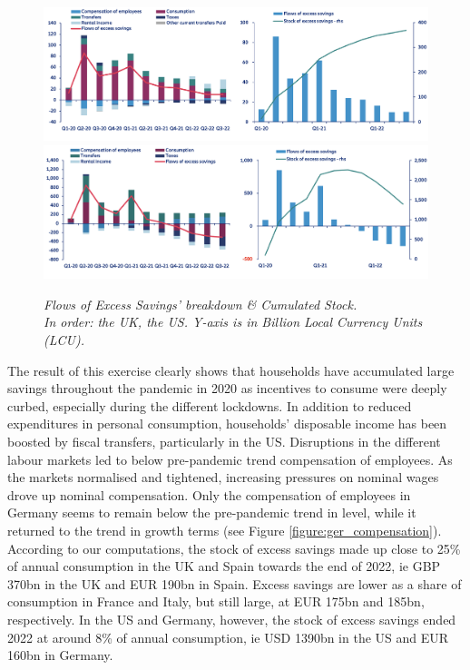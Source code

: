 \begin{figure}[H]
    \centering
    \caption{\textit{Flows of Excess Savings’ breakdown \& Cumulated Stock. \\ In order: the UK, the US. Y-axis is in Billion Local Currency Units (LCU).}}
    \includegraphics[width=.9\textwidth]{Core/1.Savings/img/xUK.png}
    \includegraphics[width=.9\textwidth]{Core/1.Savings/img/xUS.png}
    \label{figure:Flows2}
\end{figure}

The result of this exercise clearly shows that households have accumulated large savings throughout the pandemic in 2020 as incentives to consume were deeply curbed, especially during the different lockdowns. 
In addition to reduced expenditures in personal consumption, households’ disposable income has been boosted by fiscal transfers, particularly in the US. 
Disruptions in the different labour markets led to below pre-pandemic trend compensation of employees. As the markets normalised and tightened, increasing pressures on nominal wages drove up nominal compensation. 
Only the compensation of employees in Germany seems to remain below the pre-pandemic trend in level, while it returned to the trend in growth terms (see Figure \ref{figure:ger_compensation}). 
According to our computations, the stock of excess savings made up close to 25\% of annual consumption in the UK and Spain towards the end of 2022, ie GBP 370bn in the UK and EUR 190bn in Spain. 
Excess savings are lower as a share of consumption in France and Italy, but still large, at EUR 175bn and 185bn, respectively. 
In the US and Germany, however, the stock of excess savings ended 2022 at around 8\% of annual consumption, ie USD 1390bn in the US and EUR 160bn in Germany.

